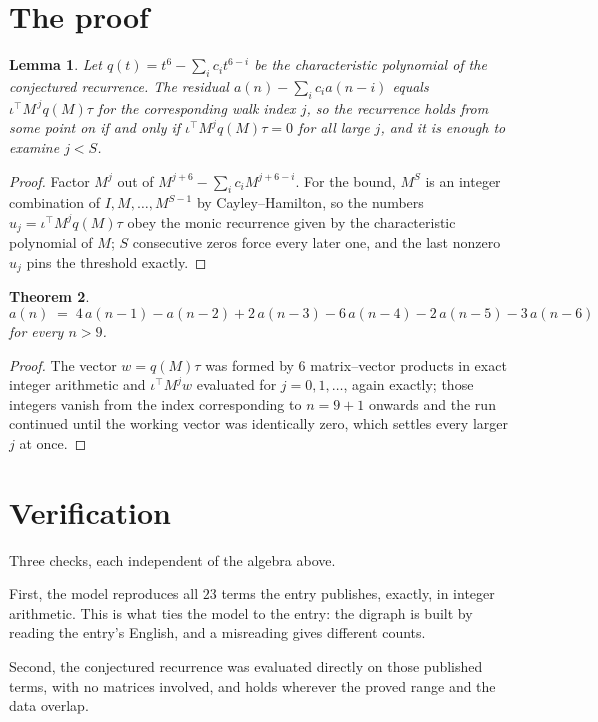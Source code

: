 \documentclass[11pt,a4paper]{article}
\theoremstyle{plain}
\newtheorem{theorem}{Theorem}
\newtheorem{lemma}[theorem]{Lemma}
\theoremstyle{definition}
\begin{document}
\section{The proof}

\begin{lemma}\label{lem:crit}
Let $q(t)=t^{6}-\sum_i c_it^{6-i}$ be the characteristic polynomial of the
conjectured recurrence. The residual $a(n)-\sum_ic_ia(n-i)$ equals
$\iota^{\!\top}M^{\,j}q(M)\tau$ for the corresponding walk index $j$, so the recurrence
holds from some point on if and only if $\iota^{\!\top}M^{j}q(M)\tau=0$ for all large $j$,
and it is enough to examine $j<S$.
\end{lemma}

\begin{proof}
Factor $M^{j}$ out of $M^{j+6}-\sum_ic_iM^{j+6-i}$. For the bound, $M^{S}$
is an integer combination of $I,M,\dots,M^{S-1}$ by Cayley--Hamilton, so the numbers
$u_j=\iota^{\!\top}M^{j}q(M)\tau$ obey the monic recurrence given by the characteristic
polynomial of $M$; $S$ consecutive zeros force every later one, and the last nonzero $u_j$
pins the threshold exactly.
\end{proof}

\begin{theorem}
\[
a(n)\;=\;4\,a(n-1) - a(n-2) + 2\,a(n-3) - 6\,a(n-4) - 2\,a(n-5) - 3\,a(n-6)
\]
for every $n>9$.
\end{theorem}

\begin{proof}
The vector $w=q(M)\tau$ was formed by $6$ matrix--vector products in exact integer
arithmetic and $\iota^{\!\top}M^{j}w$ evaluated for $j=0,1,\dots$, again exactly; those
integers vanish from the index corresponding to $n=9+1$ onwards and the run continued
until the working vector was identically zero, which settles every larger $j$ at once.
\end{proof}

\section{Verification}

Three checks, each independent of the algebra above.

First, the model reproduces all $23$ terms the entry publishes, exactly, in integer
arithmetic. This is what ties the model to the entry: the digraph is built by reading the
entry's English, and a misreading gives different counts.

Second, the conjectured recurrence was evaluated directly on those published terms, with no
matrices involved, and holds wherever the proved range and the data overlap.
\end{document}
